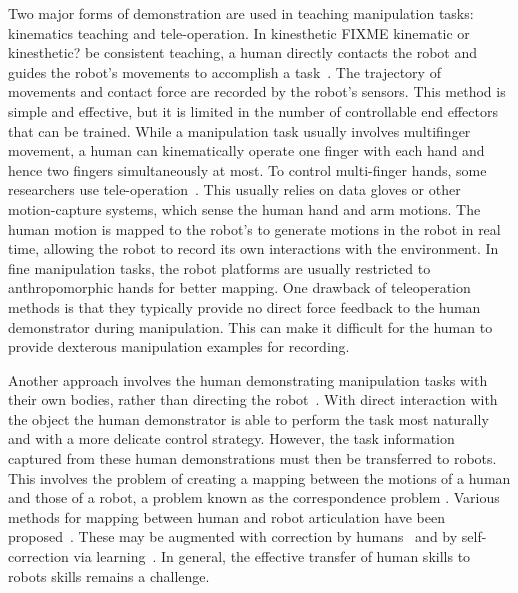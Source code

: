 Two major forms of demonstration are used in teaching manipulation
tasks: kinematics teaching and tele-operation. In kinesthetic FIXME
kinematic or kinesthetic?  be consistent %
teaching, a human directly contacts the robot and guides the robot's
movements to accomplish a
task~\citep{korkinof2013online,pais2014encoding,pastor2011skill,Miao2014}. The
trajectory of movements and contact force are recorded by the robot's
sensors.
This method is simple and effective, but it is limited in the number
of controllable end effectors that can be
trained. %
While a manipulation task usually involves multifinger movement, a
human can kinematically operate one finger with each hand and hence
two fingers simultaneously at most. To control multi-finger hands,
some researchers use
tele-operation~\citep{bernardino2013precision,kondo2008recognition,Fischer98}. This
usually relies on data gloves or other motion-capture systems, which
sense the human hand and arm motions. The human motion is mapped to
the robot's to generate motions in the robot in real time, allowing
the robot to record its own interactions with the
environment. %
In fine manipulation tasks, the robot platforms are usually restricted
to anthropomorphic hands for better mapping. One drawback of
teleoperation methods is that they typically provide no direct force
feedback to the human demonstrator during manipulation.  This can make
it difficult for the human to provide dexterous manipulation examples
for recording.

Another approach involves the human demonstrating manipulation tasks
with their own bodies, rather than directing the
robot~\citep{asfour2008imitation}. With direct interaction with the
object the human demonstrator is able to perform the task most
naturally and with a more delicate control strategy. However, the task
information captured from these human demonstrations must then be
transferred to robots. This involves the problem of creating a mapping
between the motions of a human and those of a robot, a problem known
as the correspondence problem \citep{Nehaniv02}.  Various methods for mapping between human and
robot articulation have been
proposed~\citep{hueser2006learning,asfour2008imitation,do2011towards}. These
may be augmented with 
correction by humans~\citep{calinon2007incremental,sauser2011iterative,romano2011human}
and by self-correction via learning~\citep{bidan2013robio}.%
In general, the effective transfer of human skills to robots skills
remains a challenge.

